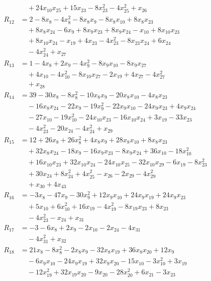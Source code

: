 \begin{align*}
&\quad{}+24x_{10}x_{25}+15x_{23}-8x_{23}^{2}-4x_{25}^{2}+x_{26}\\
R_{12}&=2-8x_{8}-4x_{8}^{2}-8x_{8}x_{9}-8x_{8}x_{10}+8x_{8}x_{23}\\
&\quad{}+8x_{8}x_{24}-6x_{9}+8x_{9}x_{23}+8x_{9}x_{24}-x_{10}+8x_{10}x_{23}\\
&\quad{}+8x_{10}x_{24}-x_{19}+4x_{23}-4x_{23}^{2}-8x_{23}x_{24}+6x_{24}\\
&\quad{}-4x_{24}^{2}+x_{27}\\
R_{13}&=1-4x_{8}+2x_{9}-4x_{9}^{2}-8x_{9}x_{10}-8x_{9}x_{27}\\
&\quad{}+4x_{10}-4x_{10}^{2}-8x_{10}x_{27}-2x_{19}+4x_{27}-4x_{27}^{2}\\
&\quad{}+x_{28}\\
R_{14}&=39-30x_{8}-8x_{8}^{2}-10x_{8}x_{9}-20x_{8}x_{10}-4x_{8}x_{23}\\
&\quad{}-16x_{8}x_{24}-22x_{9}-19x_{9}^{2}-22x_{9}x_{10}-24x_{9}x_{23}+4x_{9}x_{24}\\
&\quad{}-27x_{10}-19x_{10}^{2}-24x_{10}x_{23}-16x_{10}x_{24}+3x_{19}-33x_{23}\\
&\quad{}-4x_{23}^{2}-20x_{24}-4x_{24}^{2}+x_{29}\\
R_{15}&=12+26x_{8}+26x_{8}^{2}+4x_{8}x_{9}+28x_{8}x_{10}+8x_{8}x_{23}\\
&\quad{}+32x_{8}x_{24}-18x_{9}-16x_{9}x_{23}-8x_{9}x_{24}+36x_{10}-18x_{10}^{2}\\
&\quad{}+16x_{10}x_{23}+32x_{10}x_{24}-24x_{10}x_{25}-32x_{10}x_{29}-6x_{19}-8x_{23}^{2}\\
&\quad{}+30x_{24}+8x_{24}^{2}+4x_{25}^{2}-x_{26}-2x_{29}-4x_{29}^{2}\\
&\quad{}+x_{30}+4x_{43}\\
R_{16}&=-3x_{8}-47x_{9}-30x_{9}^{2}+12x_{9}x_{10}+24x_{9}x_{19}+24x_{9}x_{23}\\
&\quad{}+5x_{10}+6x_{10}^{2}+16x_{19}-4x_{19}^{2}-8x_{19}x_{23}+8x_{23}\\
&\quad{}-4x_{23}^{2}-x_{24}+x_{31}\\
R_{17}&=-3-6x_{8}+2x_{9}-2x_{10}-2x_{24}-4x_{31}\\
&\quad{}-4x_{31}^{2}+x_{32}\\
R_{18}&=21x_{8}-8x_{8}^{2}-2x_{8}x_{9}-32x_{8}x_{19}+36x_{8}x_{20}+12x_{9}\\
&\quad{}-6x_{9}x_{10}-24x_{9}x_{19}+32x_{9}x_{20}-15x_{10}-3x_{10}^{2}+3x_{19}\\
&\quad{}-12x_{19}^{2}+32x_{19}x_{20}-9x_{20}-28x_{20}^{2}+6x_{21}-3x_{23}\\

\end{align*}
